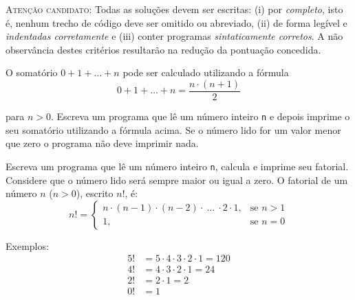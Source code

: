 \documentclass[addpoints, a4paper, 11pt]{exam}
\begin{document}
{
			
			
	\vspace{5mm}
	\makebox[0.60\textwidth][l]{\hrulefill}
	\makebox[0.15\textwidth][l]{\enspace\hrulefill}
			
	\vspace{5mm}
			
			
	\textsc{Atenção candidato:} Todas as soluções devem ser escritas: (i) por \emph{completo}, isto é, nenhum trecho de código deve ser omitido ou abreviado, (ii) de forma legível e \emph{indentadas corretamente} e (iii) conter programas \emph{sintaticamente corretos}. A não observância destes critérios resultarão na redução da pontuação concedida.
			
	\begin{questions}
						
		\question[2\half] O somatório $0 + 1 + \ldots + n$ pode ser calculado utilizando a fórmula
		\begin{equation*} \label{sum}
			0 + 1 + \ldots + n = \frac{n \cdot (n + 1)}{2}
		\end{equation*}
						
		para $n > 0$. Escreva um programa que lê um número inteiro \texttt{n} e depois imprime o seu somatório utilizando a fórmula acima. Se o número lido for um valor menor que zero o programa não deve imprimir nada.
						
		\question[2\half] Escreva um programa que lê um número inteiro \texttt{n}, calcula e imprime seu fatorial. Considere que o número lido será sempre maior ou igual a zero. O fatorial de um número $n$ ($n > 0$), escrito $n!$, é:
		\[
			n! = 
			\begin{cases}
				n \cdot (n - 1) \cdot (n - 2) \cdot~\ldots~\cdot 2 \cdot 1, & \text{se } n > 1 \\
				1,                                                          & \text{se } n = 0 
			\end{cases}
		\]
						
		Exemplos:
		\begin{align*}
			5! & = 5 \cdot 4 \cdot 3 \cdot 2 \cdot 1 = 120 \\
			4! & = 4 \cdot 3 \cdot 2 \cdot 1 = 24          \\
			2! & = 2 \cdot 1 = 2                           \\
			0! & = 1                                       
		\end{align*}
						

\end{questions}}
\end{document}
